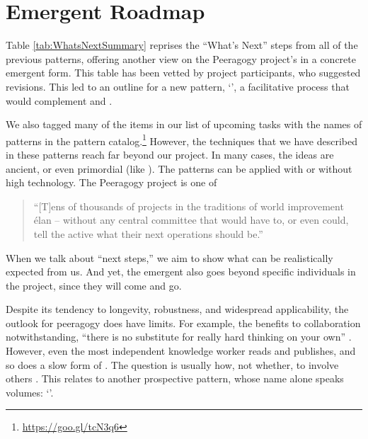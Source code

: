 \section{Emergent Roadmap} \label{sec:Distributed_Roadmap}

Table \ref{tab:WhatsNextSummary} reprises the ``What's Next'' steps
from all of the previous patterns, offering another view on the
Peeragogy project's  in a concrete emergent form.
%
This table has been vetted by project participants, who suggested
revisions.  This led to an outline for a new pattern,
`', a facilitative process that would
complement  and .

We also tagged many of the items in our list of upcoming tasks with the names of
patterns in the pattern catalog.\footnote{\url{https://goo.gl/tcN3q6}}
However, the techniques that we have described in these patterns reach
far beyond our project.  In many cases, the ideas are ancient, or even
primordial (like ).  The patterns can be
applied with or without high technology.  The Peeragogy project is one
of
\begin{quote}
 ``[T]ens of thousands of projects in the traditions of world
improvement \'elan -- without any central committee that would have
to, or even could, tell the active what their next operations should
be.'' \cite[p. 402]{sloterdijk2013change}
\end{quote}
When we talk about ``next steps,'' we aim to show what can be
realistically expected from us.
And yet, the emergent  also goes beyond specific
individuals in the project, since they will come and go.

Despite its tendency to longevity, robustness, and
widespread applicability, the outlook for peeragogy does have limits. For example,
the benefits to collaboration
notwithstanding, 
``there is no substitute for really hard
thinking on your own'' \cite{atiyah1974research}.
However, even the most independent knowledge worker reads and publishes, and so does a slow form of
.  The question is usually how, not whether, to involve others \cite{coase1937nature,coases-penguin}.
This relates to another prospective pattern, whose name alone speaks volumes:
`'.

